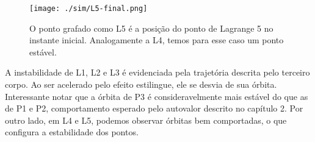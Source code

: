 \begin{figure}[H]
\centering
\texttt{[image: ./sim/L5-final.png]}
\caption{O ponto grafado como L5 é a posição do ponto de Lagrange 5 no instante inicial. Analogamente a L4, temos para esse caso um ponto estável.}
\end{figure}

   A instabilidade de L1, L2 e L3 é evidenciada pela trajetória descrita pelo terceiro corpo. Ao ser acelerado pelo efeito estilingue, ele se desvia de sua órbita. Interessante notar que a órbita de P3 é consideravelmente mais estável do que as de P1 e P2, comportamento esperado pelo autovalor descrito no capítulo 2. Por outro lado, em L4 e L5, podemos observar órbitas bem comportadas, o que configura a estabilidade dos pontos.
